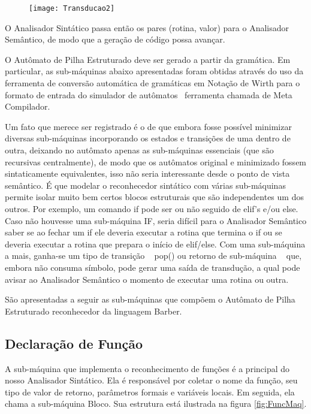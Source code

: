 \documentclass[a4paper,12pt]{report}
\begin{document}
    \begin{figure}[h]
        \centering
        \texttt{[image: Transducao2]}
    \end{figure}

    O Analisador Sintático passa então os pares (rotina, valor) para o Analisador Semântico, de modo que a geração de código possa avançar.

    O Autômato de Pilha Estruturado deve ser gerado a partir da gramática. Em particular, as sub-máquinas abaixo apresentadas foram obtidas através do uso da ferramenta de conversão automática de gramáticas em Notação de Wirth para o formato de entrada do simulador de autômatos \textemdash~ferramenta chamada de Meta Compilador.

    Um fato que merece ser registrado é o de que embora fosse possível minimizar diversas sub-máquinas incorporando os estados e transições de uma dentro de outra, deixando no autômato apenas as sub-máquinas essenciais (que são recursivas centralmente), de modo que os autômatos original e minimizado fossem sintaticamente equivalentes, isso não seria interessante desde o ponto de vista semântico. É que modelar o reconhecedor sintático com várias sub-máquinas permite isolar muito bem certos blocos estruturais que são independentes um dos outros. Por exemplo, um comando if pode ser ou não seguido de elif's e/ou else. Caso não houvesse uma sub-máquina IF, seria difícil para o Analisador Semântico saber se ao fechar um if ele deveria executar a rotina que termina o if ou se deveria executar a rotina que prepara o início de elif/else. Com uma sub-máquina a mais, ganha-se um tipo de transição \textemdash~ pop() ou retorno de sub-máquina \textemdash~ que, embora não consuma símbolo, pode gerar uma saída de transdução, a qual pode avisar ao Analisador Semântico o momento de executar uma rotina ou outra.

    São apresentadas a seguir as sub-máquinas que compõem o Autômato de Pilha Estruturado reconhecedor da linguagem Barber.

    \subsection*{Declaração de Função}
    A sub-máquina que implementa o reconhecimento de funções é a principal do nosso Analisador Sintático. Ela é responsável por coletar o nome da função, seu tipo de valor de retorno, parâmetros formais e variáveis locais. Em seguida, ela chama a sub-máquina Bloco. Sua estrutura está ilustrada na figura \ref{fig:FuncMaq}.
\end{document}
